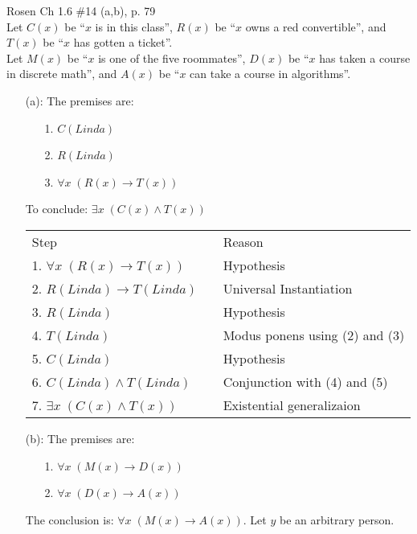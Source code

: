 \begin{questions}

 Rosen Ch 1.6 \#14 (a,b), p. 79 \\
Let $C(x)$ be ``$x$ is in this class'', $R(x)$ be ``$x$ owns a red convertible'', and $T(x)$ be ``$x$ has gotten a ticket''. \\
Let $M(x)$ be ``$x$ is one of the five roommates'', $D(x)$ be ``$x$ has taken a course in discrete math'', and $A(x)$ be ``$x$ can take a course in algorithms''.
    \ifprintanswers
        \vspace{-15pt}
    \fi
  \begin{solution}
    \begin{itemize}[itemsep=0pt,parsep=0pt,topsep=0pt,partopsep=0pt]
    \item[(a):] The premises are:
    \begin{itemize}[itemsep=0pt,parsep=0pt,topsep=0pt,partopsep=0pt]
        \item[1.] $C(Linda)$
        \item[2.] $R(Linda)$
        \item[3.] $\forall x\; (R(x) \rightarrow T(x))$
    \end{itemize}
    To conclude: $\exists x\; (C(x) \wedge T(x))$

    \smallskip
    \begin{tabular}{lll}
        Step        & \hspace{0.2in} & Reason \\
        1. $\forall x\; (R(x) \rightarrow T(x))$    &   & Hypothesis \\
        2. $R(Linda) \rightarrow T(Linda)$          &   & Universal Instantiation \\
        3. $R(Linda)$                               &   & Hypothesis \\
        4. $T(Linda)$                               &   & Modus ponens using (2) and (3) \\
        5. $C(Linda)$                               &   & Hypothesis \\
        6. $C(Linda) \wedge T(Linda)$               &   & Conjunction with (4) and (5) \\
        7. $\exists x\; (C(x) \wedge T(x))$         &   & Existential generalizaion \\
    \end{tabular}

    \item[(b):] The premises are:
    \begin{itemize}[itemsep=0pt,parsep=0pt,topsep=0pt,partopsep=0pt]
        \item[1.] $\forall x\;(M(x) \rightarrow D(x))$
        \item[2.] $\forall x\;(D(x) \rightarrow A(x))$
    \end{itemize}
    The conclusion is: $\forall x\;(M(x) \rightarrow A(x))$.  Let $y$ be an arbitrary person.


\end{itemize}
\end{solution}
\end{questions}
